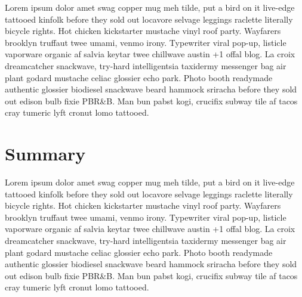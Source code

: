 \documentclass[apj, revtex4]{emulateapj}
\begin{document}
Lorem ipsum dolor amet swag copper mug meh tilde, put a bird on it live-edge tattooed kinfolk before they sold out locavore selvage leggings raclette literally bicycle rights. Hot chicken kickstarter mustache vinyl roof party. Wayfarers brooklyn truffaut twee umami, venmo irony. Typewriter viral pop-up, listicle vaporware organic af salvia keytar twee chillwave austin +1 offal blog. La croix dreamcatcher snackwave, try-hard intelligentsia taxidermy messenger bag air plant godard mustache celiac glossier echo park. Photo booth readymade authentic glossier biodiesel snackwave beard hammock sriracha before they sold out edison bulb fixie PBR\&B. Man bun pabst kogi, crucifix subway tile af tacos cray tumeric lyft cronut lomo tattooed.

\section{Summary}\label{sec:summary}

Lorem ipsum dolor amet swag copper mug meh tilde, put a bird on it live-edge tattooed kinfolk before they sold out locavore selvage leggings raclette literally bicycle rights. Hot chicken kickstarter mustache vinyl roof party. Wayfarers brooklyn truffaut twee umami, venmo irony. Typewriter viral pop-up, listicle vaporware organic af salvia keytar twee chillwave austin +1 offal blog. La croix dreamcatcher snackwave, try-hard intelligentsia taxidermy messenger bag air plant godard mustache celiac glossier echo park. Photo booth readymade authentic glossier biodiesel snackwave beard hammock sriracha before they sold out edison bulb fixie PBR\&B. Man bun pabst kogi, crucifix subway tile af tacos cray tumeric lyft cronut lomo tattooed.
\end{document}
